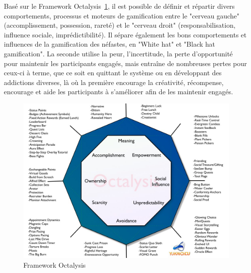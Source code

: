Basé sur le Framework Octalysis~\ref{fig:octalysis}, il est possible de définir et répartir divers comportements, processus et moteurs de gamification entre le "cerveau gauche" (accomplissement, possession, rareté) et le "cerveau droit" (responsabilisation, influence sociale, imprédictibilité). Il sépare également les bons comportements et influences de la gamification des néfastes, en "White hat" et "Black hat gamification". La seconde utilise la peur, l’incertitude, la perte d’opportunité pour maintenir les participants engagés, mais entraîne de nombreuses pertes pour ceux-ci à terme, que ce soit en quittant le système ou en développant des addictions diverses, là où la première encourage la créativité, récompense, encourage et aide les participants à s’améliorer afin de les maintenir engagés.

\begin{figure}
    \centering
    \includegraphics[width=0.9\linewidth]{Images/The-Octalysis-Framework.jpg}
    \caption{Framework Octalysis}
    \label{fig:octalysis}
\end{figure}

